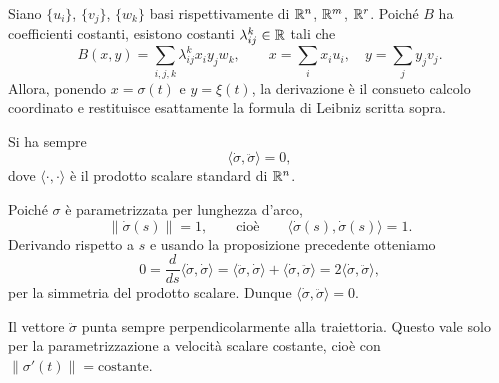\documentclass[a4paper]{article}
\begin{document}
\begin{snippetproof}{}
Siano \(\{u_i\}\), \(\{v_j\}\), \(\{w_k\}\) basi rispettivamente di \(\mathbb{R}^n\), \(\mathbb{R}^m\), \(\mathbb{R}^r\). Poiché \(B\) ha coefficienti costanti, esistono costanti \(\lambda_{ij}^{k}\in\mathbb{R}\) tali che
\[
     B(x,y)=\sum_{i,j,k}\lambda_{ij}^{k}x_i y_j w_k,
     \qquad
     x=\sum_i x_i u_i,
     \quad
     y=\sum_j y_j v_j.
\]
Allora, ponendo \(x=\sigma(t)\) e \(y=\xi(t)\), la derivazione è il consueto calcolo coordinato e restituisce esattamente la formula di Leibniz scritta sopra.
\end{snippetproof}

\begin{snippetproposition}{}
Si ha sempre
\[
     \langle \dot\sigma,\ddot\sigma\rangle = 0,
\]
dove \(\langle\cdot,\cdot\rangle\) è il prodotto scalare standard di \(\mathbb{R}^n\).
\end{snippetproposition}

\begin{snippetproof}{}
Poiché \(\sigma\) è parametrizzata per lunghezza d'arco,
\[
     \|\dot\sigma(s)\|=1,
     \qquad \text{cioè} \qquad
     \langle\dot\sigma(s),\dot\sigma(s)\rangle=1.
\]
Derivando rispetto a \(s\) e usando la proposizione precedente otteniamo
\[
     0=\frac{d}{ds}\langle\dot\sigma,\dot\sigma\rangle
     =\langle\ddot\sigma,\dot\sigma\rangle+\langle\dot\sigma,\ddot\sigma\rangle
     =2\langle\dot\sigma,\ddot\sigma\rangle,
\]
per la simmetria del prodotto scalare. Dunque \(\langle\dot\sigma,\ddot\sigma\rangle=0\).
\end{snippetproof}

Il vettore \(\ddot\sigma\) punta sempre perpendicolarmente alla traiettoria. Questo vale solo per la parametrizzazione a velocità scalare costante, cioè con \(\|\sigma'(t)\|=\text{costante}\).

\begin{center}
\end{center}
\end{document}
